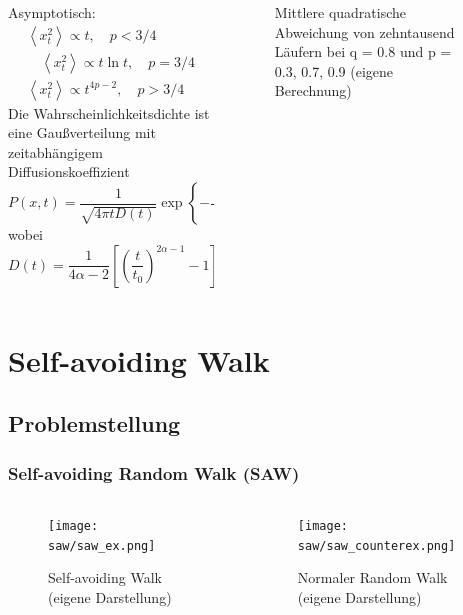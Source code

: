 \documentclass{beamer}
\begin{document}
{\begin{frame}
\begin{columns}[t]
\begin{column}[]{.5\textwidth}
			Asymptotisch:
			\begin{equation*}
				\begin{array}{c}
					\left\langle x_{t}^{2}\right\rangle\propto t, \quad p<3 / 4 \\ \quad\left\langle x_{t}^{2}\right\rangle\propto t \ln t, \quad p=3 / 4 \\
					\left\langle x_{t}^{2}\right\rangle\propto t^{4 p-2} , \quad p>3 / 4
					\end{array}
			\end{equation*}
			Die Wahrscheinlichkeitsdichte ist eine Gaußverteilung mit zeitabhängigem Diffusionskoeffizient
			\begin{equation*}
				P(x, t)=\frac{1}{\sqrt{4 \pi t D(t)}} \exp \left\{-\frac{[x-\bar{x}(t)]^{2}}{4 t D(t)}\right\}
			\end{equation*}
			wobei 
			\begin{equation*}
				D(t)=\frac{1}{4 \alpha-2}\left[\left(\frac{t}{t_{0}}\right)^{2 \alpha-1}-1\right]
			\end{equation*}
		\end{column}
		\begin{column}[]{.5\textwidth}
			\begin{figure}
				\centering
				\caption{Mittlere quadratische Abweichung von zehntausend Läufern bei q = 0.8 und p = 0.3, 0.7, 0.9 (eigene Berechnung)}
			\end{figure}
		\end{column}
	\end{columns}
\end{frame}
}
\section{Self-avoiding Walk}
\subsection{Problemstellung}
\begin{frame}
	\frametitle{Self-avoiding Random Walk (SAW)}
	\begin{columns}[t]
		\begin{column}{0.5\textwidth}
			\begin{figure}
				\centering
				\texttt{[image: saw/saw\_ex.png]}
				\caption{Self-avoiding Walk (eigene Darstellung)}
			\end{figure}
		\end{column}
		\begin{column}{0.5\textwidth}
			\begin{figure}
				\centering
				\texttt{[image: saw/saw\_counterex.png]}
				\caption{Normaler Random Walk (eigene Darstellung)}
			\end{figure}
		\end{column}
	\end{columns}
\end{frame}
\end{document}
